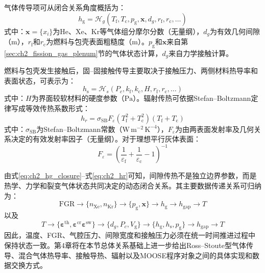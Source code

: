 气体传导项可从闭合关系角度概括为：
\begin{equation}
	h_{\mathrm g}
	=\mathcal H_g
	\left(
	T_{\mathrm f},T_{\mathrm c},p_{\mathrm g},\mathbf x,d_g,r_{\mathrm f},r_{\mathrm c},\ldots
	\right)
	\label{eq:ch2_hg_closure}
\end{equation}
\noindent 式中：$\mathbf x=\{x_i\}$为He、Xe、Kr等气体组分摩尔分数（无量纲），$d_g$为有效几何间隙（$\mathrm{m}$），$r_{\mathrm f}$和$r_{\mathrm c}$为燃料与包壳表面粗糙度（$\mathrm{m}$）。$p_{\mathrm g}$和$\mathbf x$来自第\ref{sec:ch2_fission_gas_plenum}节的气体状态计算，$d_g$来自力学接触计算。

燃料与包壳发生接触后，固--固接触传导主要取决于接触压力、两侧材料热导率和表面状态，可表示为：
\begin{equation}
	h_{\mathrm s}
	=\mathcal H_s
	\left(
	P_c,k_{\mathrm f},k_{\mathrm c},H,r_{\mathrm f},r_{\mathrm c},\ldots
	\right)
	\label{eq:ch2_hs_closure}
\end{equation}
\noindent 式中：$H$为界面较软材料的硬度参数（$\mathrm{Pa}$）。辐射传热可依据Stefan--Boltzmann定律写成等效传热系数形式：
\begin{equation}
	h_r
	=\sigma_{\mathrm{SB}}F_{\varepsilon}
	\left(T_{\mathrm f}^2+T_{\mathrm c}^2\right)
	\left(T_{\mathrm f}+T_{\mathrm c}\right)
	\label{eq:ch2_hr}
\end{equation}
\noindent 式中：$\sigma_{\mathrm{SB}}$为Stefan--Boltzmann常数（$\mathrm{W\,m^{-2}\,K^{-4}}$），$F_{\varepsilon}$为由两表面发射率及几何关系决定的有效发射率因子（无量纲）。对于理想平行灰体表面：
\begin{equation}
	F_{\varepsilon}
	=\left(
	\frac{1}{\varepsilon_{\mathrm f}}
	+\frac{1}{\varepsilon_{\mathrm c}}
	-1
	\right)^{-1}
	\label{eq:ch2_effective_emissivity}
\end{equation}


由式\eqref{eq:ch2_hg_closure}--式\eqref{eq:ch2_hr}可知，间隙传热不是独立边界参数，而是热学、力学和裂变气体状态共同决定的动态闭合关系。其主要数据传递关系可归纳为：
\begin{equation}
	\mathrm{FGR}
	\rightarrow
	\{n_{\mathrm{Xe}},n_{\mathrm{Kr}}\}
	\rightarrow
	\{p_{\mathrm g},\mathbf x\}
	\rightarrow
	h_{\mathrm g}
	\rightarrow
	h_{\mathrm{gap}}
	\rightarrow
	T
	\label{eq:ch2_fgr_gap_temperature_chain}
\end{equation}
以及
\begin{equation}
	T
	\rightarrow
	\{\boldsymbol{\varepsilon}^{\mathrm{th}},\boldsymbol{\varepsilon}^{\mathrm{cr}}
	\boldsymbol{\varepsilon}^{\mathrm{sw}}\}
	\rightarrow
	\{d_g,P_c,V_{\mathrm g}\}
	\rightarrow
	\{h_{\mathrm g},h_{\mathrm s},p_{\mathrm g}\}
	\rightarrow
	h_{\mathrm{gap}}
	\rightarrow
	T
	\label{eq:ch2_mech_gap_temperature_chain}
\end{equation}
因此，温度、FGR、气腔压力、间隙宽度和接触压力必须在统一时间推进过程中保持状态一致。第4章将在本节总体关系基础上进一步给出Ross--Stoute型气体传导、混合气体热导率、接触导热、辐射以及MOOSE程序对象之间的具体实现和数据交换方式。

